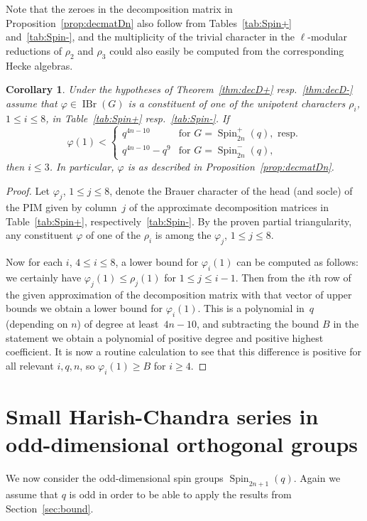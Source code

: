 \documentclass[12pt,leqno,a4paper]{amsart}
\newcommand{\IBr}{{\operatorname{IBr}}}
\newcommand{\Spin}{{\operatorname{Spin}}}
\let\vhi=\varphi
\newtheorem{cor}[thm]{Corollary}
\theoremstyle{remark}
\begin{document}
Note that the zeroes in the decomposition matrix in
Proposition~\ref{prop:decmatDn} also follow from
Tables~\ref{tab:Spin+} and~\ref{tab:Spin-}, and the multiplicity of the
trivial character in the $\ell$-modular reductions of $\rho_2$ and $\rho_3$
could also easily be computed from the corresponding Hecke algebras.

\begin{cor}   \label{cor:boundD}
 Under the hypotheses of Theorem~\ref{thm:decD+} resp.~\ref{thm:decD-}
 assume that $\vhi\in\IBr(G)$ is a constituent of one of the unipotent
 characters $\rho_i$, $1\le i\le 8$, in Table~\ref{tab:Spin+}
 resp.~\ref{tab:Spin-}. If
 $$\vhi(1)<\begin{cases}
   q^{4n-10}& \text{for }G=\Spin_{2n}^+(q), \text{ resp.}\\
   q^{4n-10}-q^9& \text{for }G=\Spin_{2n}^-(q),\end{cases}$$
 then $i\le3$.
 In particular, $\vhi$ is as described in Proposition~\ref{prop:decmatDn}.
\end{cor}

\begin{proof}
Let $\vhi_j$, $1\le j\le 8$, denote the Brauer character of the head (and
socle) of the PIM given by column~$j$ of the approximate decomposition matrices
in Table~\ref{tab:Spin+}, respectively~\ref{tab:Spin-}. By the proven partial
triangularity, any constituent $\vhi$ of one of the $\rho_i$ is among the
$\vhi_j$, $1\le j\le 8$.  \par
Now for each $i$, $4\le i\le 8$, a lower bound for $\vhi_i(1)$ can be computed
as follows: we certainly have $\vhi_j(1)\le\rho_j(1)$ for $1\le j\le i-1$.
Then from the $i$th row of the given approximation of the decomposition matrix
with that vector of upper bounds we obtain a lower bound for $\vhi_i(1)$. This
is a polynomial in~$q$ (depending on $n$) of degree at least~$4n-10$, and
subtracting the bound $B$ in the statement we obtain a polynomial of positive
degree and positive highest coefficient. It is now a routine calculation to
see that this difference is positive for all relevant $i,q,n$, so
$\vhi_i(1)\ge B$ for $i\ge4$.
\end{proof}


\section{Small Harish-Chandra series in odd-dimensional orthogonal groups}
\label{sec:orth-odd}
We now consider the odd-dimensional spin groups $\Spin_{2n+1}(q)$. Again we
assume that $q$ is odd in order to be able to apply the results from
Section~\ref{sec:bound}.
\end{document}

